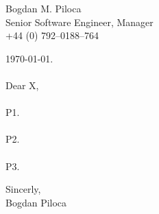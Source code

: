 \documentclass[oneside,10pt]{memoir}
\begin{document}
\noindent
Bogdan M. Piloca \\ %
Senior Software Engineer, Manager \\
+44 (0) 792--0188--764 \\

\begin{vplace}[0.77]
\noindent
\today.\\
\\
Dear X, \\
\\
P1.\\
\\
P2.\\
\\
P3.\\
\end{vplace}

\noindent
Sincerly,\\
Bogdan Piloca
\end{document}

